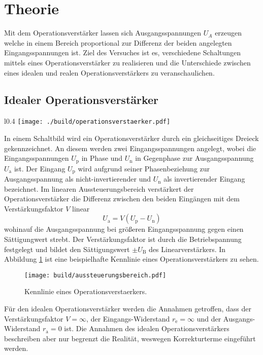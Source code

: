 \section{Theorie}\label{sec:theorie}
Mit dem Operationsverstärker lassen sich Ausgangsspannungen $U_A$
erzeugen welche in einem Bereich proportional zur Differenz der beiden
angelegten Eingangsspannungen ist.
Ziel des Versuches ist es, verschiedene Schaltungen mittels eines
Operationsverstärker zu realisieren und die Unterschiede zwischen eines idealen
und realen Operationsverstärkers zu veranschaulichen.

\subsection{Idealer Operationsverstärker}%
\label{sub:idealer_operationsverstaerker}

\begin{wrapfigure}{l}{0.4\textwidth}
		\centering
		\texttt{[image: ./build/operationsverstaerker.pdf]}
		\caption{Schaltbild eines idealen Operationsverstärkers.
		\cite{anleitung}}
		\label{fig:opv}
\end{wrapfigure}
In einem Schaltbild wird ein Operationsverstärker durch ein gleichseitiges
Dreieck gekennzeichnet.
An diesem werden zwei Eingangsspannungen angelegt, wobei die
Eingangsspannungen $U_\text{p}$ in Phase
und $U_\text{n}$ in Gegenphase zur Ausgangsspannung
$U_\text{a}$ ist.
Der Eingang $U_\text{p}$ wird aufgrund seiner Phasenbeziehung zur Ausgangsspannung
als nicht-invertierender und $U_\text{n}$ als invertierender Eingang bezeichnet.
Im linearen Aussteuerungsbereich verstärkert der Operationsverstärker die
Differenz zwischen den beiden Eingängen mit dem Verstärkungsfaktor $V$ linear
\begin{equation}
		\label{eq:diff}
		U_\text{a} = V \left( U_\text{p} - U_\text{n} \right)
\end{equation}
wohinauf die Ausgangsspannung bei größeren Eingangsspannung gegen einen
Sättigungwert strebt.
Der Verstärkungsfaktor ist durch die Betriebspannung festgelegt
und bildet den Sättigungswert $\pm U_\text{B}$  des Linearverstärkers.
In Abbildung \ref{fig:kennlinie} ist eine beispielhafte Kennlinie eines
Operationsverstärkers zu sehen.
\begin{figure}[h]
		\centering
		\texttt{[image: build/aussteuerungsbereich.pdf]}
		\caption{Kennlinie eines Operationsverstaerkers. \cite{anleitung}}
		\label{fig:kennlinie}
\end{figure}
Für den idealen Operationsverstärker werden die Annahmen getroffen, dass der
Verstärkungsfaktor $V = \infty$, der Eingangs-Widerstand $r_\text{e} =
\infty$ und der Ausgangs-Widerstand $r_\text{a} = 0$ ist.
Die Annahmen des idealen Operationsverstärkers beschreiben aber nur begrenzt
die Realität, weswegen Korrekturterme eingeführt werden.

